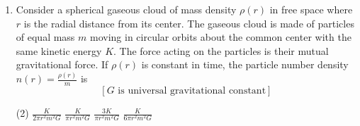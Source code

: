
\begin{enumerate}
    \item Consider a spherical gaseous cloud of mass density \( \rho(r) \) in free space where \( r \) is the radial distance from its center. The gaseous cloud is made of particles of equal mass \( m \) moving in circular orbits about the common center with the same kinetic energy \( K \). The force acting on the particles is their mutual gravitational force. If \( \rho(r) \) is constant in time, the particle number density \( n(r) = \frac{\rho(r)}{m} \) is \[ [G \text{ is universal gravitational constant}] \]
        \begin{tasks}(2)
            \task \( \frac{K}{2 \pi r^2 m^2 G} \)
            \task \( \frac{K}{\pi r^2 m^2 G} \)
            \task \( \frac{3K}{\pi r^2 m^2 G} \)
            \task \( \frac{K}{6 \pi r^2 m^2 G} \)
        \end{tasks}
\end{enumerate}
